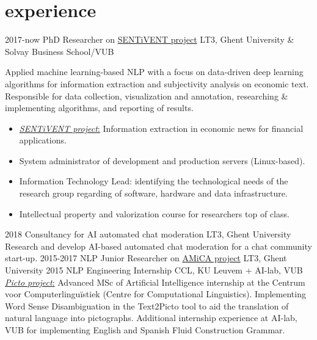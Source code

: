 \documentclass[]{friggeri-cv-a4}
\begin{document}
\section{experience}
\begin{entrylist}
    \entry
        {2017-now}
        {PhD Researcher on \href{https://www.lt3.ugent.be/projects/event-extraction-and-sentiment-analysis-for-financ/}{SENTiVENT project}}
        {LT3, Ghent University \& Solvay Business School/VUB}
        {Applied machine learning-based NLP with a focus on data-driven deep learning algorithms for information extraction and subjectivity analysis on economic text. Responsible for data collection, visualization and annotation, researching \& implementing algorithms, and reporting of results.
        \begin{itemize}
            \item \href{https://www.lt3.ugent.be/projects/event-extraction-and-sentiment-analysis-for-financ/}{\emph{SENTiVENT project}:} Information extraction in economic news for financial applications.
            \item System administrator of development and production servers (Linux-based).
            \item Information Technology Lead: identifying the technological needs of the research group regarding of software, hardware and data infrastructure.
            \item Intellectual property and valorization course for researchers top of class. %
        \end{itemize}}
    \entry
        {2018}
        {Consultancy for AI automated chat moderation}
        {LT3, Ghent University}
        {Research and develop AI-based automated chat moderation for a chat community start-up.}
    \entry
        {2015-2017}
        {NLP Junior Researcher on \href{http://amicaproject.be/}{AMiCA project}}
        {LT3, Ghent University}
        {}
    \entry
        {2015}
        {NLP Engineering Internship}
        {CCL, KU Leuvem + AI-lab, VUB}
        {\href{http://picto.ccl.kuleuven.be/}{\emph{Picto project}:} Advanced MSc of Artificial Intelligence internship at the Centrum voor Computerlinguïstiek (Centre for Computational Linguistics). Implementing Word Sense Disambiguation in the Text2Picto tool to aid the translation of natural language into pictographs. Additional internship experience at AI-lab, VUB for implementing English and Spanish Fluid Construction Grammar.}
\end{entrylist}
\end{document}

